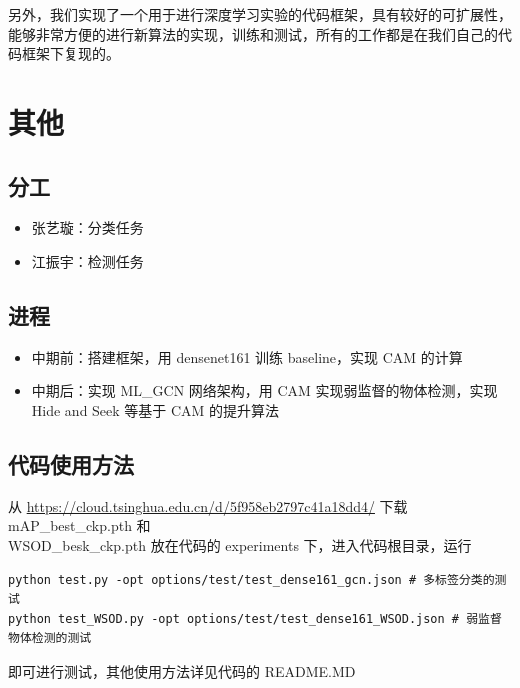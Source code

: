 \documentclass[a4paper]{ctexart}
\begin{document}
另外，我们实现了一个用于进行深度学习实验的代码框架，具有较好的可扩展性，能够非常方便的进行新算法的实现，训练和测试，所有的工作都是在我们自己的代码框架下复现的。

\section{其他}
\subsection{分工}
\begin{itemize}
    \item 张艺璇：分类任务
    \item 江振宇：检测任务
\end{itemize}

\subsection{进程}
\begin{itemize}
    \item 中期前：搭建框架，用 densenet161 训练 baseline，实现 CAM 的计算
    \item 中期后：实现 ML\_GCN 网络架构，用 CAM 实现弱监督的物体检测，实现 Hide and Seek 等基于 CAM 的提升算法
\end{itemize}

\subsection{代码使用方法}
从 \url{https://cloud.tsinghua.edu.cn/d/5f958eb2797c41a18dd4/} 下载 mAP\_best\_ckp.pth 和  \\WSOD\_besk\_ckp.pth 放在代码的 experiments 下，进入代码根目录，运行

\begin{verbatim}
python test.py -opt options/test/test_dense161_gcn.json # 多标签分类的测试
python test_WSOD.py -opt options/test/test_dense161_WSOD.json # 弱监督物体检测的测试
\end{verbatim}

即可进行测试，其他使用方法详见代码的 README.MD



\end{document}
